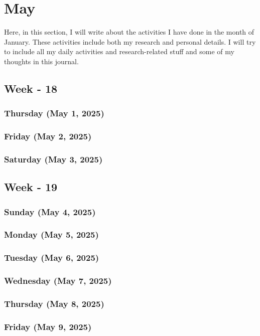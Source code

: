 \chapter{May}
Here, in this section, I will write about the activities\cite{zhou2015} I have done in the month of January. These activities include both my research and personal details. I will try to include all my daily activities and research-related stuff and some of my thoughts in this journal.

\section{Week - 18}
\subsection*{Thursday (May 1, 2025)}
\subsection*{Friday (May 2, 2025)}
\subsection*{Saturday (May 3, 2025)}

\section{Week - 19}
\subsection*{Sunday (May 4, 2025)}
\subsection*{Monday (May 5, 2025)}
\subsection*{Tuesday (May 6, 2025)}
\subsection*{Wednesday (May 7, 2025)}
\subsection*{Thursday (May 8, 2025)}
\subsection*{Friday (May 9, 2025)}
